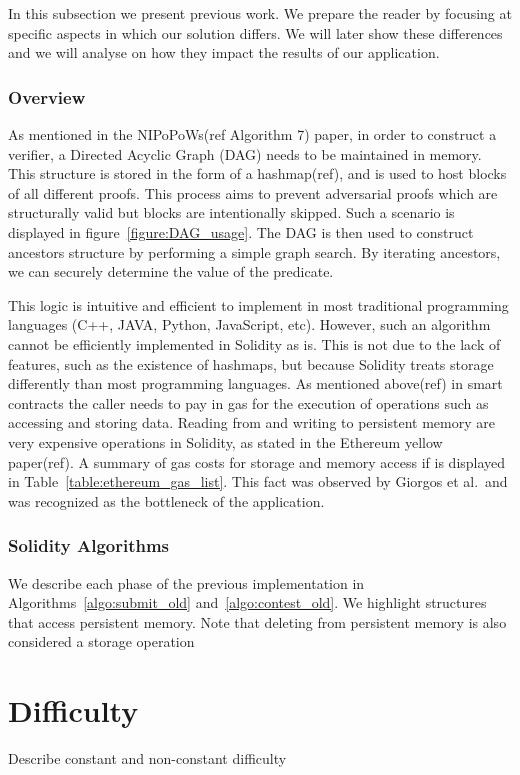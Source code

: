 In this subsection we present previous work. We prepare the reader by focusing
at specific aspects in which our solution differs. We will later show these
differences and we will analyse on how they impact the results of our
application.

\subsubsection{Overview} As mentioned in the NIPoPoWs(ref Algorithm 7) paper,
in order to construct a verifier, a Directed Acyclic Graph (DAG) needs to be
maintained in memory. This structure is stored in the form of a hashmap(ref),
and is used to host blocks of all different proofs. This process aims to
prevent adversarial proofs which are structurally valid but blocks are
intentionally skipped. Such a scenario is displayed in
figure~\ref{figure:DAG_usage}. The DAG is then used to construct ancestors
structure by performing a simple graph search. By iterating ancestors, we can
securely determine the value of the predicate.



This logic is intuitive and efficient to implement in most traditional
programming languages (C++, JAVA, Python, JavaScript, etc). However, such an
algorithm cannot be efficiently implemented in Solidity as is. This is not due
to the lack of features, such as the existence of hashmaps, but because
Solidity treats storage differently than most programming languages. As
mentioned above(ref) in smart contracts the caller needs to pay in gas for the
execution of operations such as accessing and storing data. Reading from and
writing to persistent memory are very expensive operations in Solidity, as
stated in the Ethereum yellow paper(ref). A summary of gas costs for storage
and memory access if is displayed in Table~\ref{table:ethereum_gas_list}. This
fact was observed by Giorgos et al.\ and was recognized as the bottleneck of
the application.



\subsubsection{Solidity Algorithms}

We describe each phase of the previous implementation in
Algorithms~\ref{algo:submit_old} and~\ref{algo:contest_old}. We highlight
structures that access persistent memory. Note that deleting from persistent
memory is also considered a storage operation




\section{Difficulty}

Describe constant and non-constant difficulty
